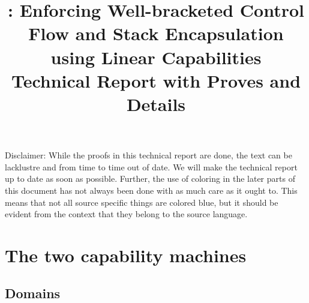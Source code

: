 \documentclass[a4paper]{article}
\title{\stktokens{}: Enforcing Well-bracketed Control Flow and Stack Encapsulation using Linear Capabilities\\
  Technical Report with Proves and Details}
\begin{document}
\maketitle
\tableofcontents
Disclaimer: While the proofs in this technical report are done, the text can be lacklustre and from time to time out of date.
We will make the technical report up to date as soon as possible.
Further, the use of coloring in the later parts of this document has not always been done with as much care as it ought to. This means that not all source specific things are colored blue, but it should be evident from the context that they belong to the source language.

\section{The two capability machines}
\subsection{Domains}
\label{sec:domains}
\end{document}
